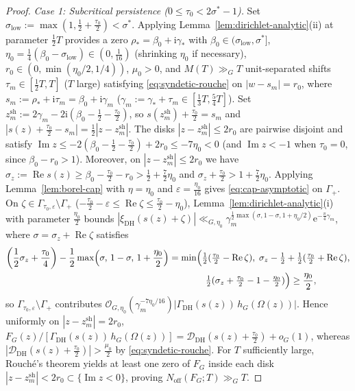 \documentclass[11pt,a4paper,reqno]{amsart}
\theoremstyle{definition}
\theoremstyle{remark}
\numberwithin{equation}{section}
\newcommand{\ii}{\mathrm{i}}
\newcommand{\ee}{\mathrm{e}}
\DeclareMathOperator{\Reop}{Re}
\DeclareMathOperator{\Imop}{Im}
\begin{document}
\begin{proof}
\emph{Case 1: Subcritical persistence ($0 \le \tau_0 < 2\sigma^* - 1$).} Set $\sigma_{\mathrm{low}} := \max(1, \frac{1}{2} + \frac{\tau_0}{2}) < \sigma^*$. Applying Lemma~\ref{lem:dirichlet-analytic}(ii) at parameter $\frac{1}{2}T$ provides a zero $\rho_* = \beta_0 + \ii\gamma_*$ with $\beta_0 \in (\sigma_{\mathrm{low}}, \sigma^*]$, $\eta_0 = \frac{1}{4}(\beta_0 - \sigma_{\mathrm{low}}) \in (0, \frac{1}{16})$ (shrinking $\eta_0$ if necessary), $r_0 \in (0, \min(\eta_0/2, 1/4))$, $\mu_0 > 0$, and $M(T) \gg_G T$ unit-separated shifts $\tau_m \in [\frac{1}{2}T, T]$ ($T$ large) satisfying \eqref{eq:syndetic-rouche} on $|w - s_m| = r_0$, where $s_m := \rho_* + \ii\tau_m = \beta_0 + \ii\gamma_m$ ($\gamma_m := \gamma_* + \tau_m \in [\frac{1}{3}T, \frac{5}{4}T]$). Set $z_m^{\mathrm{sh}} := 2\gamma_m - 2\ii(\beta_0 - \frac{1}{2} - \frac{\tau_0}{2})$, so $s(z_m^{\mathrm{sh}}) + \frac{\tau_0}{2} = s_m$ and $|s(z) + \frac{\tau_0}{2} - s_m| = \frac{1}{2}|z - z_m^{\mathrm{sh}}|$. The disks $|z - z_m^{\mathrm{sh}}| \le 2r_0$ are pairwise disjoint and satisfy $\Imop z \le -2(\beta_0 - \frac{1}{2} - \frac{\tau_0}{2}) + 2r_0 \le -7\eta_0 < 0$ (and $\Imop z < -1$ when $\tau_0 = 0$, since $\beta_0 - r_0 > 1$). Moreover, on $|z - z_m^{\mathrm{sh}}| \le 2r_0$ we have $\sigma_z := \Reop s(z) \ge \beta_0 - \frac{\tau_0}{2} - r_0 > \frac{1}{2} + \frac{7}{2}\eta_0$ and $\sigma_z + \frac{\tau_0}{2} > 1 + \frac{7}{2}\eta_0$. Applying Lemma~\ref{lem:borel-cap} with $\eta = \eta_0$ and $\varepsilon = \frac{\eta_0}{16}$ gives \eqref{eq:cap-asymptotic} on $\Gamma_+$. On $\zeta \in \Gamma_{\tau_0,\varepsilon} \setminus \Gamma_+$ ($-\frac{\tau_0}{2} - \varepsilon \le \Reop\zeta \le \frac{\tau_0}{2} - \eta_0$), Lemma~\ref{lem:dirichlet-analytic}(i) with parameter $\frac{\eta_0}{2}$ bounds $|\xi_{\mathrm{DH}}(s(z)+\zeta)| \ll_{G,\eta_0} \gamma_m^{\frac{1}{2}\max(\sigma, 1-\sigma, 1+\eta_0/2)}\ee^{-\frac{\pi}{4}\gamma_m}$, where $\sigma = \sigma_z + \Reop\zeta$ satisfies
\begin{equation*}
  \begin{aligned}
    \left(\frac{1}{2}\sigma_z + \frac{\tau_0}{4}\right) - \frac{1}{2}\max\Bigl(\sigma,\, 1 - \sigma,\, 1 + \frac{\eta_0}{2}\Bigr)
    &= \min\Bigl(\tfrac{1}{2}(\tfrac{\tau_0}{2} - \Reop\zeta),\; \sigma_z - \tfrac{1}{2} + \tfrac{1}{2}(\tfrac{\tau_0}{2} + \Reop\zeta), \\
    &\qquad\qquad \tfrac{1}{2}(\sigma_z + \tfrac{\tau_0}{2} - 1 - \tfrac{\eta_0}{2})\Bigr) \ge \frac{\eta_0}{2},
  \end{aligned}
\end{equation*}
so $\Gamma_{\tau_0,\varepsilon} \setminus \Gamma_+$ contributes $\mathcal{O}_{G,\eta_0}(\gamma_m^{-7\eta_0/16})|\Gamma_{\mathrm{DH}}(s(z))\,h_G(\Omega(z))|$. Hence uniformly on $|z - z_m^{\mathrm{sh}}| = 2r_0$, $F_G(z)/[\Gamma_{\mathrm{DH}}(s(z))\,h_G(\Omega(z))] = \mathcal{D}_{\mathrm{DH}}(s(z) + \frac{\tau_0}{2}) + o_G(1)$, whereas $|\mathcal{D}_{\mathrm{DH}}(s(z) + \frac{\tau_0}{2})| > \frac{\mu_0}{2}$ by \eqref{eq:syndetic-rouche}. For $T$ sufficiently large, Rouch\'e's theorem yields at least one zero of $F_G$ inside each disk $|z - z_m^{\mathrm{sh}}| < 2r_0 \subset \{\Imop z < 0\}$, proving $N_{\mathrm{off}}(F_G; T) \gg_G T$.


\end{proof}
\end{document}
